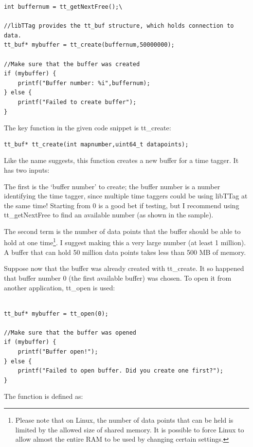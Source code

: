 \documentclass[10pt]{article}
\begin{document}
\begin{verbatim}
int buffernum = tt_getNextFree();\

//libTTag provides the tt_buf structure, which holds connection to data.
tt_buf* mybuffer = tt_create(buffernum,50000000);

//Make sure that the buffer was created
if (mybuffer) {
    printf("Buffer number: %i",buffernum);
} else {
    printf("Failed to create buffer");
}
\end{verbatim}

The key function in the given code snippet is tt\_create:

\begin{verbatim}
tt_buf* tt_create(int mapnumber,uint64_t datapoints);
\end{verbatim}

Like the name suggests, this function creates a new buffer for a time tagger. It has two inputs:

The first is the `buffer number' to create; the buffer number is a number identifying the time tagger, since multiple time taggers could be using libTTag at the same time! Starting from 0 is a good bet if testing, but I recommend
using tt\_getNextFree to find an available number (as shown in the sample).

The second term is the number of data points that the buffer should be able to hold
at one time\footnote{Please note that on Linux, the number of data points that can be held is limited by the allowed size
of shared memory. It is possible to force Linux to allow almost the entire RAM to be used by changing 
certain settings.}. I suggest making this a very large number (at least 1 million). A buffer that can hold 50 million data points
takes less than 500 MB of memory.

Suppose now that the buffer was already created with tt\_create. It so happened that
buffer number 0 (the first available buffer) was chosen. To open it from another application, tt\_open is used:

\begin{verbatim}

tt_buf* mybuffer = tt_open(0);

//Make sure that the buffer was opened
if (mybuffer) {
    printf("Buffer open!");
} else {
    printf("Failed to open buffer. Did you create one first?");
}
\end{verbatim}

The function is defined as:
\end{document}
